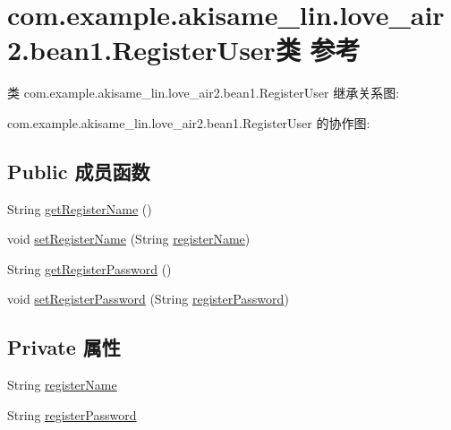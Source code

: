 \hypertarget{classcom_1_1example_1_1akisame__lin_1_1love__air2_1_1bean1_1_1_register_user}{}\section{com.\+example.\+akisame\+\_\+lin.\+love\+\_\+air2.\+bean1.\+Register\+User类 参考}
\label{classcom_1_1example_1_1akisame__lin_1_1love__air2_1_1bean1_1_1_register_user}


类 com.\+example.\+akisame\+\_\+lin.\+love\+\_\+air2.\+bean1.\+Register\+User 继承关系图\+:


com.\+example.\+akisame\+\_\+lin.\+love\+\_\+air2.\+bean1.\+Register\+User 的协作图\+:
\subsection*{Public 成员函数}
\begin{DoxyCompactItemize}
\item 
String \mbox{\hyperlink{classcom_1_1example_1_1akisame__lin_1_1love__air2_1_1bean1_1_1_register_user_a8b6560686bffe8aa6eba1349aa8e2b1a}{get\+Register\+Name}} ()
\item 
void \mbox{\hyperlink{classcom_1_1example_1_1akisame__lin_1_1love__air2_1_1bean1_1_1_register_user_aaf2021b6d2025068b1ebd71a18073f9a}{set\+Register\+Name}} (String \mbox{\hyperlink{classcom_1_1example_1_1akisame__lin_1_1love__air2_1_1bean1_1_1_register_user_aa4b05090bc8de7aacc20860f4d50f393}{register\+Name}})
\item 
String \mbox{\hyperlink{classcom_1_1example_1_1akisame__lin_1_1love__air2_1_1bean1_1_1_register_user_a08a79f71e3b58076374b0352e4ec908d}{get\+Register\+Password}} ()
\item 
void \mbox{\hyperlink{classcom_1_1example_1_1akisame__lin_1_1love__air2_1_1bean1_1_1_register_user_a9bd89ee843f2d8ab977edc8da6fa6a74}{set\+Register\+Password}} (String \mbox{\hyperlink{classcom_1_1example_1_1akisame__lin_1_1love__air2_1_1bean1_1_1_register_user_a3ada3dcce6da01aa3419baf8c05f0b64}{register\+Password}})
\end{DoxyCompactItemize}
\subsection*{Private 属性}
\begin{DoxyCompactItemize}
\item 
String \mbox{\hyperlink{classcom_1_1example_1_1akisame__lin_1_1love__air2_1_1bean1_1_1_register_user_aa4b05090bc8de7aacc20860f4d50f393}{register\+Name}}
\item 
String \mbox{\hyperlink{classcom_1_1example_1_1akisame__lin_1_1love__air2_1_1bean1_1_1_register_user_a3ada3dcce6da01aa3419baf8c05f0b64}{register\+Password}}
\end{DoxyCompactItemize}


